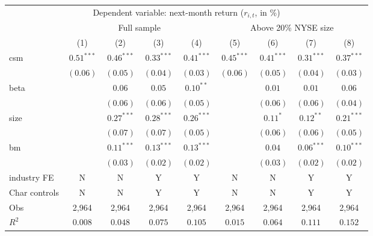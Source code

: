 \begin{tabular}{lcccccccc}
  \hline \multicolumn{9}{c}{Dependent variable: next-month return ($r_{i,t}$, in \%)} \\
 \cmidrule(l){2-9}  & \multicolumn{4}{c}{Full sample} & \multicolumn{4}{c}{Above 20\% NYSE size} \\
 \cmidrule(l){2-5} \cmidrule(l){6-9}  \vspace{5pt} & (1) & (2) & (3) & (4) & (5) & (6) & (7) & (8) \\ 
  csm & $0.51^{***}$ & $0.46^{***}$ & $0.33^{***}$ & $0.41^{***}$ & $0.45^{***}$ & $0.41^{***}$ & $0.31^{***}$ & $0.37^{***}$ \\ 
   & $(0.06)$ & $(0.05)$ & $(0.04)$ & $(0.03)$ & $(0.06)$ & $(0.05)$ & $(0.04)$ & $(0.03)$ \\ 
  beta &  & $0.06$ & $0.05$ & $0.10^{**}$ &  & $0.01$ & $0.01$ & $0.06$ \\ 
   &  & $(0.06)$ & $(0.06)$ & $(0.05)$ &  & $(0.06)$ & $(0.06)$ & $(0.04)$ \\ 
  size &  & $0.27^{***}$ & $0.28^{***}$ & $0.26^{***}$ &  & $0.11^{*}$ & $0.12^{**}$ & $0.21^{***}$ \\ 
   &  & $(0.07)$ & $(0.07)$ & $(0.05)$ &  & $(0.06)$ & $(0.06)$ & $(0.05)$ \\ 
  bm &  & $0.11^{***}$ & $0.13^{***}$ & $0.13^{***}$ &  & $0.04$ & $0.06^{***}$ & $0.10^{***}$ \\ 
   \vspace{5pt} &  & $(0.03)$ & $(0.02)$ & $(0.02)$ &  & $(0.03)$ & $(0.02)$ & $(0.02)$ \\ 
  industry FE & N & N & Y & Y & N & N & Y & Y \\ 
   \vspace{5pt}Char controls & N & N & Y & Y & N & N & Y & Y \\ 
  Obs & 2,964 & 2,964 & 2,964 & 2,964 & 2,964 & 2,964 & 2,964 & 2,964 \\ 
  $R^2$ & $0.008$ & $0.048$ & $0.075$ & $0.105$ & $0.015$ & $0.064$ & $0.111$ & $0.152$ \\ 
   \bottomrule\end{tabular}
